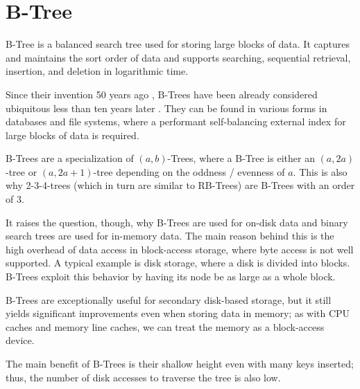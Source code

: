 \section{B-Tree}

B-Tree is a balanced search tree used for storing large blocks of data. It captures and maintains the sort order of data and supports searching, sequential retrieval, insertion, and deletion in logarithmic time.

Since their invention 50 years ago \cite{bayer-org}, B-Trees have been already considered ubiquitous less than ten years later \cite{10.1145/356770.356776}. They can be found in various forms in databases and file systems, where a performant self-balancing external index for large blocks of data is required.

B-Trees are a specialization of $(a,b)$-Trees, where a B-Tree is either an $(a, 2a)$-tree or $(a, 2a + 1)$-tree depending on the oddness / evenness of $a$. This is also why 2-3-4-trees (which in turn are similar to RB-Trees) are B-Trees with an order of 3.

It raises the question, though, why B-Trees are used for on-disk data and binary search trees are used for in-memory data. The main reason behind this is the high overhead of data access in block-access storage, where byte access is not well supported. A typical example is disk storage, where a disk is divided into blocks. B-Trees exploit this behavior by having its node be as large as a whole block.

B-Trees are exceptionally useful for secondary disk-based storage, but it still yields significant improvements even when storing data in memory; as with CPU caches and memory line caches, we can treat the memory as a block-access device.

The main benefit of B-Trees is their shallow height even with many keys inserted; thus, the number of disk accesses to traverse the tree is also low.




